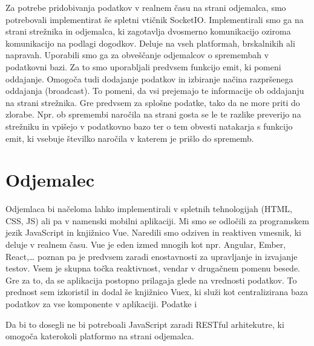 \documentclass[a4paper, 12pt]{book}
\begin{document}
Za potrebe pridobivanja podatkov v realnem času na strani odjemalca, smo potrebovali implementirat še spletni vtičnik SocketIO. Implementirali smo ga na strani strežnika in odjemalca, ki zagotavlja dvosmerno komunikacijo oziroma komunikacijo na podlagi dogodkov. Deluje na vseh platformah, brskalnikih ali napravah. Uporabili smo ga za obveščanje odjemalcov o spremembah v podatkovni bazi. Za to smo uporabljali predvsem funkcijo emit, ki pomeni oddajanje. Omogoča tudi dodajanje podatkov in izbiranje načina razpršenega oddajanja (broadcast). To pomeni, da vsi prejemajo te informacije ob oddajanju na strani strežnika. Gre predvsem za splošne podatke, tako da ne more priti do zlorabe. Npr. ob spremembi naročila na strani gosta se le te razlike preverijo na strežniku in vpišejo v podatkovno bazo ter o tem obvesti natakarja s funkcijo emit, ki vsebuje številko naročila v katerem je prišlo do sprememb. 

\section{Odjemalec}

Odjemlaca bi načeloma lahko implementirali v spletnih tehnologijah (HTML, CSS, JS) ali pa v namenski mobilni aplikaciji. Mi smo se odločili za programskem jezik JavaScript in knjižnico Vue.  Naredili smo odziven in reaktiven vmesnik, ki deluje v realnem času. Vue je eden izmed mnogih kot npr. Angular, Ember, React,… poznan pa je predvsem zaradi enostavnosti za upravljanje in izvajanje testov. Vsem je skupna točka reaktivnost, vendar v drugačnem pomenu besede. Gre za to, da se aplikacija postopno prilagaja glede na vrednosti podatkov. To prednost sem izkoristil in dodal še knjižnico Vuex, ki služi kot centralizirana baza podatkov za vse komponente v aplikaciji. Podatke i

Da bi to dosegli ne bi potreboali JavaScript zaradi RESTful arhitekutre, ki omogoča katerokoli platformo na strani odjemalca.
\end{document}
